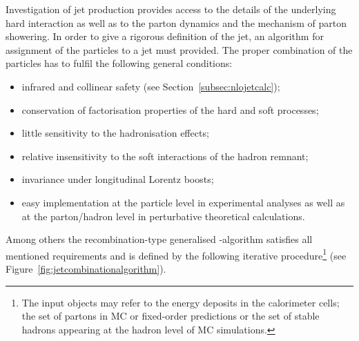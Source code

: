 Investigation of jet production provides access to the details of the underlying hard interaction as well as to the parton dynamics and the mechanism of parton showering. In order to give a rigorous definition of the jet, an algorithm for assignment of the particles to a jet must provided. The proper combination of the particles has to fulfil the following general conditions:
\begin{itemize}
	\item infrared and collinear safety (see Section~\ref{subsec:nlojetcalc});
	\item conservation of factorisation properties of the hard and soft processes;
	\item little sensitivity to the hadronisation effects;
	\item relative insensitivity to the soft interactions of the hadron remnant;
	\item invariance under longitudinal Lorentz boosts;
	\item easy implementation at the particle level in experimental analyses as well as at the parton/hadron level in perturbative theoretical calculations.
\end{itemize}
Among others the recombination-type generalised \kt-algorithm satisfies all mentioned requirements and is defined by the following iterative procedure\footnote{The input objects may refer to the energy deposits in the calorimeter cells; the set of partons in MC or fixed-order predictions or the set of stable hadrons appearing at the hadron level of MC simulations.} (see Figure~\ref{fig:jetcombinationalgorithm}).
